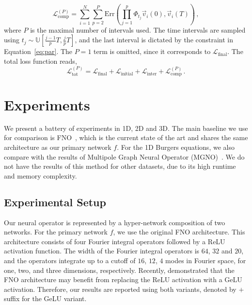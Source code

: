 \documentclass{article}
\theoremstyle{plain}
\theoremstyle{definition}
\theoremstyle{remark}
\newcommand{\rmse}{\text{Err}}
\begin{document}
\begin{equation}
    \mathcal{L}_{\text{comp}}^{(P)} = \sum_{i=1}^{N}\sum_{p=2}^P \rmse\left(\prod_{j=1}^p
    \Phi_{t_j} \vec{v}_i\left(0\right) , \vec{v}_i\left(T\right) \right) \,,
    \label{eq:Lcomp}
\end{equation}
where $P$ is the maximal number of intervals used. The time intervals are sampled using
${t_j} \sim \mathbb{U}\left[ {\frac{{j - 1}}{p}T,\frac{j}{p}T} \right]$, and the last interval is dictated by the constraint in Equation~\eqref{eq:par}. The $P=1$ term is omitted, since it corresponds to $\mathcal{L}_{\text{final}}$. The total loss function reads,
\begin{equation}
   \mathcal{L}_{\text{tot}}^{(P)} =  \mathcal{L}_{\text{final}}+
   \mathcal{L}_{\text{initial}}+
   \mathcal{L}_{\text{inter}}+
   \mathcal{L}_{\text{comp}}^{(P)}\,.
\end{equation}






\section{Experiments}

We present a battery of experiments in 1D, 2D and 3D. The main baseline we use for comparison is FNO~\citep{anandkumar2020neural}, which is the current state of the art and shares the same architecture as our primary network $f$. For the 1D Burgers equations, we also compare with the results of Multipole Graph Neural Operator (MGNO)~\citep{li2020multipole}. We do not have the results of this method for other datasets, due to its high runtime and memory complexity.

\subsection{Experimental Setup}

Our neural operator is represented by a hyper-network composition of two networks. For the primary network $f$,  we use the original FNO architecture. This architecture consists of four Fourier integral operators followed by a ReLU activation function. The width of the Fourier integral operators is $64$, $32$ and $20$, and the operators integrate up to a cutoff of $16$, $12$, $4$ modes in Fourier space, for one, two, and three dimensions, respectively. Recently, \citet{DBLP:journals/corr/abs-2108-08481} demonstrated that the FNO architecture may benefit from replacing the ReLU activation with a GeLU activation. Therefore, our results are reported using both variants, denoted by $+$ suffix for the GeLU variant.
\end{document}
